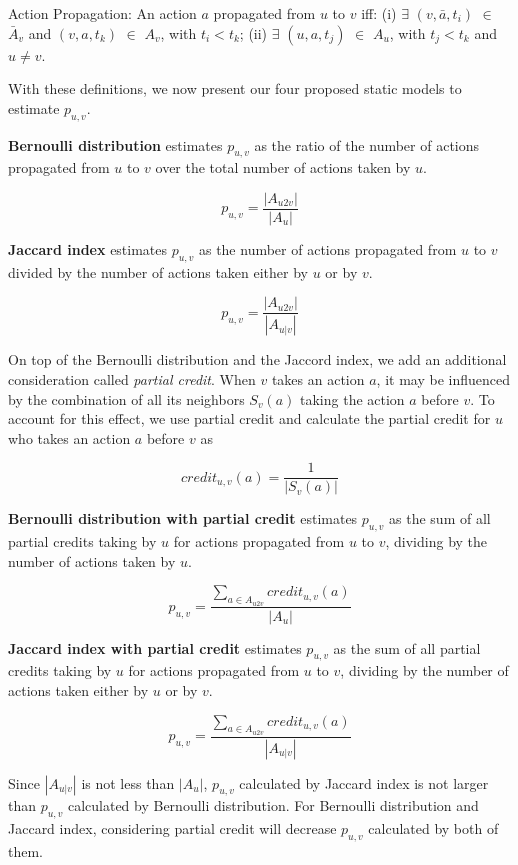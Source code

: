 {Action Propagation:}
An action $a$ propagated from $u$ to $v$ iff: (i) $\exists$ $(v, \bar{a}, t_i)$ $\in$ $\bar{A}_v$ 
and $(v, a, t_k)$ $\in$ $A_v$, with $t_i < t_k$; (ii) $\exists$ $(u, a, t_j)$ $\in$ $A_u$, with $t_j < t_k$ and $u \neq v$. 

With these definitions, we now present our four proposed static models to estimate $p_{u,v}$.

{\bf Bernoulli distribution} estimates $p_{u,v}$ as the ratio of the number of actions 
propagated from $u$ to $v$ over the total number of actions taken by $u$.

$$p_{u,v} = \frac{|A_{u2v}|}{|A_u|}$$ 

{\bf Jaccard index} estimates 
$p_{u,v}$ as the number of actions propagated from $u$ to $v$ divided by 
the number of actions taken either by $u$ or by $v$.

$$p_{u,v} = \frac{|A_{u2v}|}{|A_{u|v}|}$$ 

On top of the Bernoulli distribution and the Jaccord index,
we add an additional consideration called {\em partial credit}.
When $v$ takes an action $a$, it may be influenced by the combination of all its neighbors $S_v(a)$ 
taking the action $a$ before $v$. %
To account for this effect, we use partial credit 
and calculate the partial credit for $u$ who takes an action $a$ before $v$ as 

$$credit_{u,v}(a) = \frac{1}{|S_v(a)|}$$

{\bf Bernoulli distribution with partial credit} 
estimates $p_{u,v}$ as the sum of all partial credits taking by $u$ for actions propagated from $u$ to $v$, 
dividing by the number of actions taken by $u$. 

$$p_{u,v} = \frac{\sum\limits_{a \in A_{u2v}}{credit_{u,v}(a)}}{|A_u|}$$

{\bf Jaccard index with partial credit} 
estimates $p_{u,v}$ as the sum of all partial credits taking by $u$ for actions propagated from $u$ to $v$, 
dividing by the number of actions taken either by $u$ or by $v$. 

$$p_{u,v} = \frac{\sum\limits_{a \in A_{u2v}}{credit_{u,v}(a)}}{|A_{u|v}|}$$


Since $|A_{u|v}|$ is not less than $|A_u|$, 
$p_{u,v}$ calculated by Jaccard index is not larger than $p_{u,v}$ calculated by Bernoulli distribution. 
For Bernoulli distribution and Jaccard index, 
considering partial credit will decrease $p_{u,v}$ calculated by both of them. 

